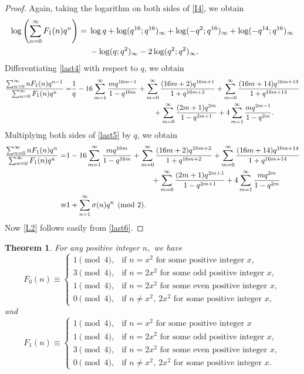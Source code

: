 \documentclass[12pt]{article}
\numberwithin{equation}{section}
\newtheorem{theorem}{Theorem}[section]
\theoremstyle{definition}
\theoremstyle{remark}
\numberwithin{equation}{section}
\begin{document}
\begin{proof}
Again,  taking the logarithm on both sides of \eqref{I4}, we obtain
\begin{align}
\log \left(\sum_{n=0}^{\infty}F_1(n)q^n\right)
={}&
\log q
+\log(q^{16};q^{16})_{\infty}
+\log(-q^2;q^{16})_{\infty}
+\log(-q^{14};q^{16})_{\infty} \notag\\
&\label{last4}-\log(q;q^2)_{\infty}
-2\log(q^2;q^2)_{\infty}.
\end{align}
Differentiating \eqref{last4} with respect to $q$, we obtain
\begin{align}
\dfrac{\sum_{n=0}^{\infty}nF_1(n)q^{n-1}}{\sum_{n=0}^{\infty}F_1(n)q^n}
=&
\dfrac{1}{q}
-16\sum_{m=1}^{\infty}\dfrac{mq^{16m-1}}{1-q^{16m}}
+\sum_{m=0}^{\infty}\dfrac{(16m+2)q^{16m+1}}{1+q^{16m+2}} 
+\sum_{m=0}^{\infty}\dfrac{(16m+14)q^{16m+13}}{1+q^{16m+14}}\notag\\
&\label{last5}\hspace{4cm}+\sum_{m=0}^{\infty}\dfrac{(2m+1)q^{2m}}{1-q^{2m+1}} 
+4\sum_{m=1}^{\infty}\dfrac{mq^{2m-1}}{1-q^{2m}}.
\end{align}
Multiplying both sides of \eqref{last5} by $q$, we obtain
\begin{align}
\dfrac{\sum_{n=0}^{\infty}nF_1(n)q^{n}}{\sum_{n=0}^{\infty}F_1(n)q^n}
=&
1
-16\sum_{m=1}^{\infty}\dfrac{mq^{16m}}{1-q^{16m}}
+\sum_{m=0}^{\infty}\dfrac{(16m+2)q^{16m+2}}{1+q^{16m+2}} 
+\sum_{m=0}^{\infty}\dfrac{(16m+14)q^{16m+14}}{1+q^{16m+14}}\notag\\
&\hspace{4cm}+\sum_{m=0}^{\infty}\dfrac{(2m+1)q^{2m+1}}{1-q^{2m+1}} 
+4\sum_{m=1}^{\infty}\dfrac{mq^{2m}}{1-q^{2m}}\notag\\
\equiv&\label{last6}1+\sum_{n=1}^{\infty}\sigma(n)q^n
\pmod 2.
\end{align}
Now \eqref{L2} follows easily from \eqref{last6}.
\end{proof}
\begin{theorem}
For any positive integer $n,$ we have 
\begin{equation}\label{t3r}
F_0(n)\equiv
\begin{cases}
1 \pmod 4, & \text{if $n=x^2$ for some positive integer $x$},\\[4pt]
3 \pmod 4, & \text{if $n=2x^2$ for some odd positive integer $x$},\\[4pt]
1 \pmod 4, & \text{if $n=2x^2$ for some even positive integer $x$},\\[4pt]
0 \pmod 4, & \text{if $n\neq x^2,\ 2x^2$ for some positive integer $x,$}
\end{cases}
\end{equation}
and 
\begin{equation}\label{A35}
F_1(n)\equiv
\begin{cases}
1 \pmod 4, & \text{if  $n=x^2$ for some positive integer $x$}\\[4pt]
1 \pmod 4, & \text{if $n=2x^2$ for some odd positive integer $x$},\\[4pt]
3 \pmod 4, & \text{if $n=2x^2$ for some even positive integer $x$},\\[4pt]
0 \pmod 4, & \text{if $n\neq x^2,\ 2x^2$ for some positive integer $x.$}
\end{cases}
\end{equation}
\end{theorem}
\end{document}
